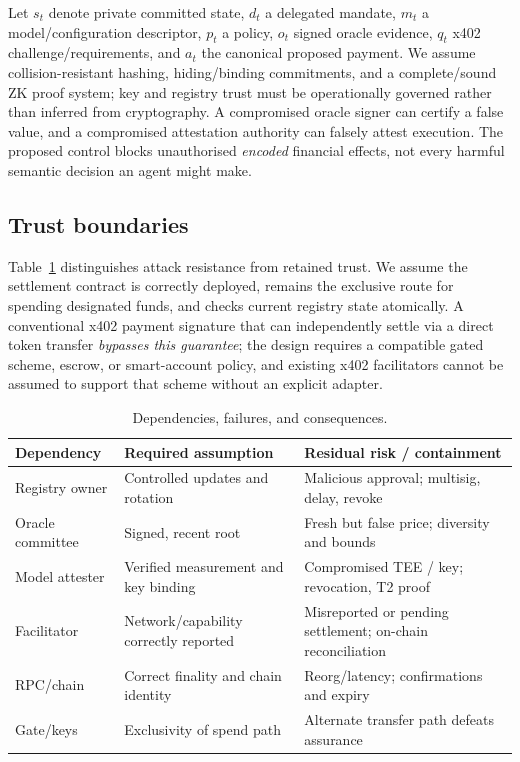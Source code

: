 \documentclass[conference]{IEEEtran}
\begin{document}
Let \(s_t\) denote private committed state, \(d_t\) a delegated mandate, \(m_t\) a model/configuration descriptor, \(p_t\) a policy, \(o_t\) signed oracle evidence, \(q_t\) x402 challenge/requirements, and \(a_t\) the canonical proposed payment. We assume collision-resistant hashing, hiding/binding commitments, and a complete/sound ZK proof system; key and registry trust must be operationally governed rather than inferred from cryptography. A compromised oracle signer can certify a false value, and a compromised attestation authority can falsely attest execution. The proposed control blocks unauthorised \emph{encoded} financial effects, not every harmful semantic decision an agent might make.

\subsection{Trust boundaries}
Table~\ref{tab:trust} distinguishes attack resistance from retained trust. We assume the settlement contract is correctly deployed, remains the exclusive route for spending designated funds, and checks current registry state atomically. A conventional x402 payment signature that can independently settle via a direct token transfer \emph{bypasses this guarantee}; the design requires a compatible gated scheme, escrow, or smart-account policy, and existing x402 facilitators cannot be assumed to support that scheme without an explicit adapter.

\begin{table}[t]
\caption{Dependencies, failures, and consequences.}
\label{tab:trust}
\centering\footnotesize
\setlength{\tabcolsep}{3pt}
\begin{tabularx}{\columnwidth}{@{}p{}XX@{}}
\toprule
Dependency & Required assumption & Residual risk / containment \\
\midrule
Registry owner & Controlled updates and rotation & Malicious approval; multisig, delay, revoke \\
Oracle committee & Signed, recent root & Fresh but false price; diversity and bounds \\
Model attester & Verified measurement and key binding & Compromised TEE / key; revocation, T2 proof \\
Facilitator & Network/capability correctly reported & Misreported or pending settlement; on-chain reconciliation \\
RPC/chain & Correct finality and chain identity & Reorg/latency; confirmations and expiry \\
Gate/keys & Exclusivity of spend path & Alternate transfer path defeats assurance \\
\bottomrule
\end{tabularx}
\end{table}
\end{document}
